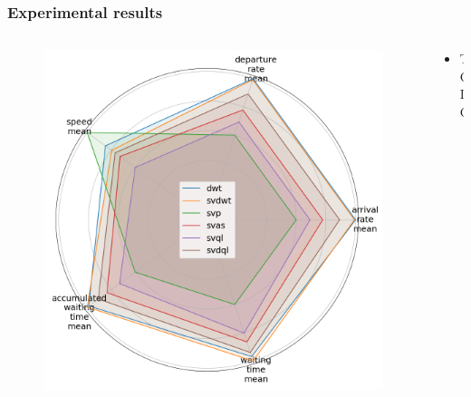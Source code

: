 \documentclass[dvipsnames]{beamer}
\begin{document}
\begin{frame}
\frametitle{Experimental results}
  \begin{columns}
  \begin{column}{0.5\textwidth}
    \begin{figure}
      \centering
      \includegraphics[width=1.0\textwidth]{figures/rew-sharing-radar.png}
    \end{figure}
  \end{column}
  \begin{column}{0.5\textwidth}
    \begin{itemize}
      \item TODO
    \end{itemize}
  \end{column}
\end{columns}
\end{frame}
\end{document}
